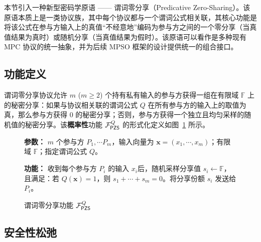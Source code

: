 本节引入一种新型密码学原语 —— 谓词零分享（Predicative Zero-Sharing）。该原语本质上是一类协议族，其中每个协议都与一个谓词公式相关联，其核心功能是将该公式在参与方输入上的真值“不经意地”编码为参与方之间的一个零分享（当真值结果为真时）或随机分享（当真值结果为假时）。该原语可以看作是多种现有 MPC 协议的统一抽象，并为后续 MPSO 框架的设计提供统一的组合接口。

\subsection{功能定义}\label{def:pzs}

谓词零分享协议允许 $m$ ($m \ge 2$) 个持有私有输入的参与方获得一组在有限域 $\mathbb{F}$ 上的秘密分享：如果与协议相关联的谓词公式 $Q$ 在所有参与方的输入上的取值为真，那么参与方获得 $0$ 的秘密分享；否则，参与方获得一个独立且均匀采样的随机值的秘密分享。该\textbf{概率性}功能 $\mathcal{F}_\mathsf{PZS}^Q$ 的形式化定义如图~\ref{fig:func-pzs} 所示。

\begin{figure}[!htb]
\begin{framed}
\begin{minipage}[c]{\textwidth}
\begin{trivlist}
\item \textbf{参数：} $m$ 个参与方 $P_1, \cdots P_m$，输入向量为 $\textbf{x} = (x_1, \cdots, x_m)$；有限域 $\mathbb{F}$；指定谓词公式 $Q$。
\item \textbf{功能：} 收到每个参与方 $P_i$ 的输入 $x_i$后，随机采样分享值 $s_i \gets \mathbb{F}$，且满足：若 $Q(\textbf{x}) = 1$，则 $s_1 + \cdots + s_m = 0$。将分享份额 $s_i$ 发送给 $P_i$。
\end{trivlist}
\end{minipage}
\end{framed}
\caption{谓词零分享功能 $\mathcal{F}_\mathsf{PZS}^Q$}\label{fig:func-pzs}
\end{figure}

\subsection{安全性松弛}\label{relaxed-pzs}

